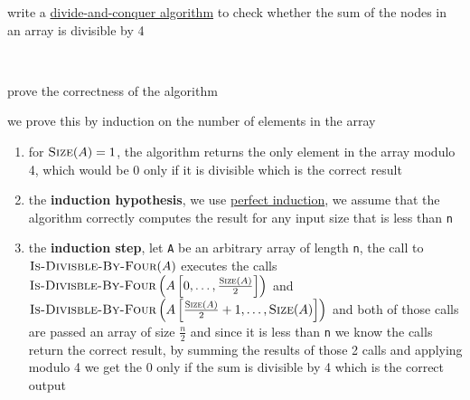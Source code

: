 \documentclass[a4paper,12pt]{article}
\begin{document}
\begin{question}
write a \href{20220706211939-divide_and_conquer_algorithm.org}{divide-and-conquer algorithm} to check whether the sum of the nodes in an array is divisible by 4\\[0pt]
\begin{answer}
\begin{center}

\end{center}\\[0pt]
\end{answer}
\begin{subquestion}
prove the correctness of the algorithm\\[0pt]
\begin{answer}
we prove this by induction on the number of elements in the array\\[0pt]
\begin{enumerate}
\item for \(\textsc{Size}(A)=1\), the algorithm returns the only element in the array modulo 4, which would be 0 only if it is divisible which is the correct result\\[0pt]
\item the \textbf{induction hypothesis}, we use \href{20220707193301-mathematical_induction.org}{perfect induction}, we assume that the algorithm correctly computes the result for any input size that is less than \texttt{n}\\[0pt]
\item the \textbf{induction step}, let \texttt{A} be an arbitrary array of length \texttt{n}, the call to \(\textsc{Is-Divisble-By-Four}(A)\) executes the calls \(\textsc{Is-Divisble-By-Four}\left(A\left[0,\dots,\frac{\textsc{Size}(A)}{2}\right]\right)\) and \(\textsc{Is-Divisble-By-Four}\left(A\left[\frac{\textsc{Size}(A)}{2}+1,\dots,\textsc{Size}(A)\right]\right)\) and both of those calls are passed an array of size \(\frac{n}{2}\) and since it is less than \texttt{n} we know the calls return the correct result, by summing the results of those 2 calls and applying modulo 4 we get the 0 only if the sum is divisible by 4 which is the correct output\\[0pt]
\end{enumerate}
\end{answer}
\end{subquestion}
\end{question}
\end{document}
